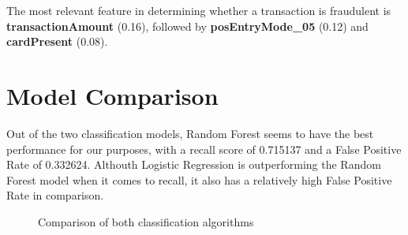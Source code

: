 \documentclass[12pt]{article}
\begin{document}
The most relevant feature in determining whether a transaction is fraudulent is \textbf{transactionAmount} (0.16), followed by \textbf{posEntryMode\_05} (0.12) and \textbf{cardPresent} (0.08).

\newpage
\section{Model Comparison}
Out of the two classification models, Random Forest seems to have the best performance for our purposes, with a recall score of 0.715137 and a False Positive Rate of 0.332624. Althouth Logistic Regression is outperforming the Random Forest model when it comes to recall, it also has a relatively high False Positive Rate in comparison. 

\begin{figure}[h]
    \centering
    \hspace{1cm}
    \caption{Comparison of both classification algorithms}
    \label{fig:tables}
\end{figure}
\end{document}
